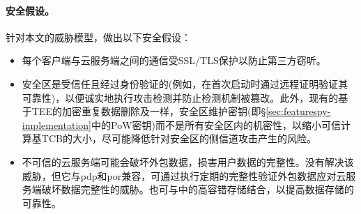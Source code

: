 \paragraph*{安全假设。}针对本文的威胁模型，做出以下安全假设：
\begin{itemize}[leftmargin=0em]
    \item 每个客户端与云服务端之间的通信受SSL/TLS保护以防止第三方窃听。
    \item 安全区是受信任且经过身份验证的(例如，在首次启动时通过远程证明验证其可靠性)，以便诚实地执行攻击检测并防止检测机制被篡改。此外，现有的基于TEE的加密重复数据删除及\sysnameS 一样，安全区维护密钥(即\S\ref{sec:featurespy-implementation}中的PoW密钥)而不是所有安全区内的机密性，以缩小可信计算基TCB的大小，尽可能降低针对安全区的侧信道攻击产生的风险。
    \item 不可信的云服务端可能会破坏外包数据，损害用户数据的完整性。\sysnameF 没有解决该威胁，但它与\gls{pdp}和\gls{por}兼容，可通过执行定期的完整性验证外包数据应对云服务端破坏数据完整性的威胁。\sysnameF 也可与中的高容错存储结合，以提高数据存储的可靠性。
\end{itemize}